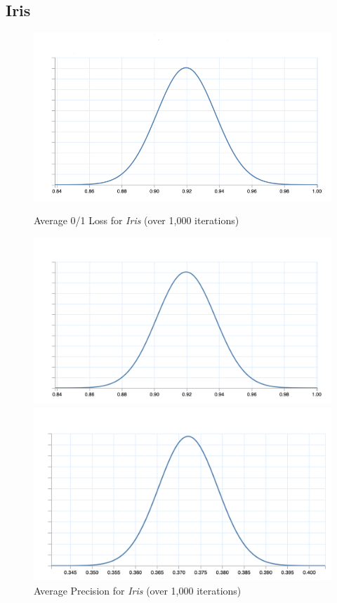 \documentclass[twoside,11pt]{article}
\begin{document}
\subsection{Iris}
\begin{figure}[!hbp] %
    \centering
    \begin{minipage}[b]{0.7\textwidth}
      \includegraphics[width=\textwidth]{01_loss_graph.png}
      \caption{Average 0/1 Loss for \emph{Iris} (over 1,000 iterations)}
    \end{minipage}
    \hfill
    \begin{minipage}[b]{0.4\textwidth}
      \includegraphics[width=\textwidth]{precision_graph.png}
      \caption{Average Precision for \emph{Iris} (over 1,000 iterations)}
    \end{minipage}
    \hfill
    \begin{minipage}[b]{0.4\textwidth}
        \includegraphics[width=\textwidth]{recall_graph.png}

\end{minipage}
\end{figure}
\end{document}
